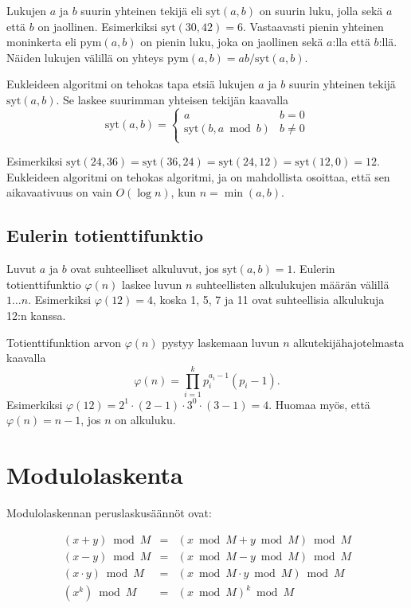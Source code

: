 Lukujen $a$ ja $b$ suurin yhteinen tekijä eli $\textrm{syt}(a,b)$
on suurin luku, jolla sekä $a$ että $b$ on jaollinen.
Esimerkiksi $\textrm{syt}(30,42)=6$.
Vastaavasti pienin yhteinen moninkerta eli $\textrm{pym}(a,b)$
on pienin luku, joka on jaollinen sekä $a$:lla että $b$:llä.
Näiden lukujen välillä on yhteys $\textrm{pym}(a,b)=ab/\textrm{syt}(a,b)$.

Eukleideen algoritmi on tehokas tapa etsiä
lukujen $a$ ja $b$ suurin yhteinen tekijä $\textrm{syt}(a,b)$.
Se laskee suurimman yhteisen tekijän kaavalla
\begin{equation*}
    \textrm{syt}(a,b) = \begin{cases}
               a        & b = 0\\
               \textrm{syt}(b,a \bmod b) & b \neq 0\\
           \end{cases}
\end{equation*}

\noindent
Esimerkiksi $\textrm{syt}(24,36) = \textrm{syt}(36,24)
= \textrm{syt}(24,12) = \textrm{syt}(12,0)=12$.
Eukleideen algoritmi on tehokas
algoritmi, ja on mahdollista osoittaa,
että sen aikavaativuus on vain $O(\log n)$,
kun $n=\min(a,b)$.

\subsection{Eulerin totienttifunktio}

Luvut $a$ ja $b$ ovat suhteelliset alkuluvut,
jos $\textrm{syt}(a,b)=1$.
Eulerin totienttifunktio $\varphi(n)$
laskee luvun $n$ suhteellisten alkulukujen
määrän välillä $1 \ldots n$.
Esimerkiksi $\varphi(12)=4$,
koska 1, 5, 7 ja 11 ovat suhteellisia
alkulukuja 12:n kanssa.

Totienttifunktion arvon $\varphi(n)$ pystyy laskemaan
luvun $n$ alkutekijähajotelmasta kaavalla
\[ \varphi(n) = \prod_{i=1}^k p_i^{a_i-1}(p_i-1). \]
Esimerkiksi $\varphi(12)=2^1 \cdot (2-1) \cdot 3^0 \cdot (3-1)=4$.
Huomaa myös, että $\varphi(n)=n-1$,
jos $n$ on alkuluku.

\section{Modulolaskenta}

Modulolaskennan peruslaskusäännöt ovat:

\[
\begin{array}{lcl}
(x+y) \bmod M & = & (x \bmod M + y \bmod M) \bmod M \\
(x-y) \bmod M & = & (x \bmod M - y \bmod M) \bmod M \\
(x \cdot y) \bmod M & = & (x \bmod M \cdot y \bmod M) \bmod M \\
(x^k) \bmod M & = & (x \bmod M)^k \bmod M \\
\end{array}
\]

